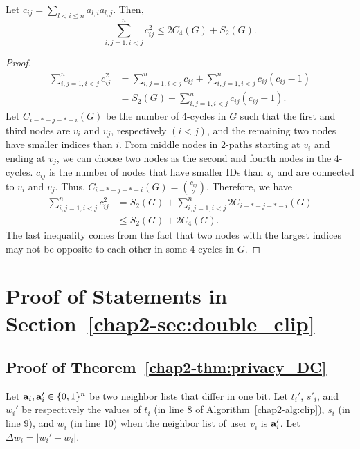 {\begin{lemma}
  \label{chap2-lem:c_ij_4cycle_2star}
  Let $c_{ij} = \sum_{l < i \leq n} a_{l,i} a_{l,j}$. Then,
\[
    \sum_{i,j=1, i<j}^n c_{ij}^2 \leq 2 C_4(G) + S_2(G).
\]
\end{lemma}
\begin{proof}
  \begin{align*}
      \sum_{i,j=1, i<j}^n c_{ij}^2
      &= \sum_{i,j=1, i<j}^n c_{ij} + \sum_{i,j=1, i<j}^n c_{ij}(c_{ij}-1) \\
      &= S_2(G) + \sum_{i,j=1, i<j}^n c_{ij}(c_{ij}-1).
  \end{align*}
  Let $C_{i-*-j-*-i}(G)$ be the number of 4-cycles in $G$
  such that the first and third nodes are $v_i$ and $v_j$, respectively $(i<j)$, and the remaining two nodes have smaller indices than $i$.
  From middle nodes in 2-paths starting at $v_i$ and ending at $v_j$, we can choose two nodes as the second and fourth nodes in the 4-cycles.
  $c_{ij}$ is the number of nodes that have smaller IDs than $v_i$ and are connected to $v_i$ and $v_j$.
  Thus,
  $C_{i-*-j-*-i}(G) = \binom{c_{ij}}{2}$.
  Therefore, we have
  \begin{align*}
      \sum_{i,j=1, i<j}^n c_{ij}^2
       &= S_2(G) + \sum_{i,j=1, i<j}^n 2C_{i-*-j-*-i}(G) \\
      &\leq S_2(G) + 2 C_4(G).
  \end{align*}
The last inequality comes from the fact that
two nodes with the largest indices may not be opposite to each other in some 4-cycles in $G$.
\end{proof}

\section{Proof of Statements in Section~\ref{chap2-sec:double_clip}}
\label{chap2-sec:proof_double_clip}
\subsection{Proof of Theorem~\ref{chap2-thm:privacy_DC}}

Let $\mathbf{a}_i, \mathbf{a}'_i \in \{0,1\}^n$ be two neighbor lists that differ in one bit.
Let ${t_i}'$, $s'_i$, and ${w_i}'$ be respectively the values of $t_i$ (in line 8 of Algorithm~\ref{chap2-alg:clip}), $s_i$ (in line 9), and $w_i$ (in line 10) when the neighbor list of user $v_i$ is $\mathbf{a}'_i$.
Let $\Delta w_i = |{w_i}' - w_i|$.

}
